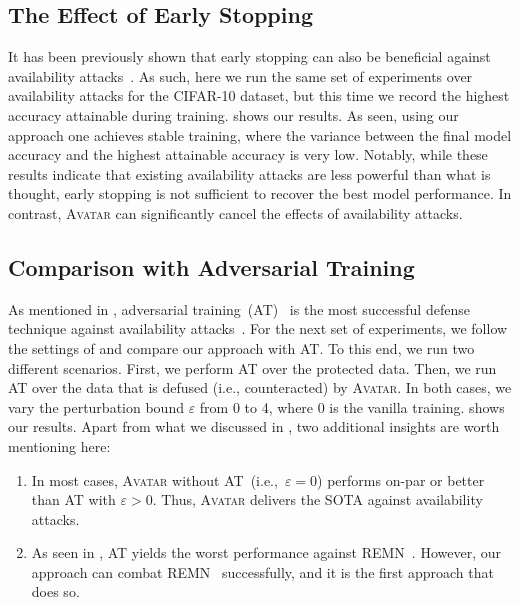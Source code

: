 \documentclass[conference]{IEEEtran}
\theoremstyle{definition}
\theoremstyle{remark}
\theoremstyle{proposition}
\begin{document}
\subsection{The Effect of Early Stopping}\label{sec:sec:early_stopping}
It has been previously shown that early stopping can also be beneficial against availability attacks~\citep{huang2021emn}.
As such, here we run the same set of experiments over availability attacks for the CIFAR-10 dataset, but this time we record the highest accuracy attainable during training.
 shows our results.
As seen, using our approach one achieves stable training, where the variance between the final model accuracy and the highest attainable accuracy is very low.
Notably, while these results indicate that existing availability attacks are less powerful than what is thought, early stopping is not sufficient to recover the best model performance.
In contrast, \textsc{Avatar} can significantly cancel the effects of availability attacks.

\subsection{Comparison with Adversarial Training}\label{sec:sec:AT}
As mentioned in , adversarial training~(AT)~\citep{madry2018towards} is the most successful defense technique against availability attacks~\citep{tao2021preventing}.
For the next set of experiments, we follow the settings of \citet{fu2022remn} and compare our approach with AT.
To this end, we run two different scenarios.
First, we perform AT over the protected data.
Then, we run AT over the data that is defused (i.e., counteracted) by \textsc{Avatar}.
In both cases, we vary the perturbation bound $\varepsilon$ from 0 to 4, where 0 is the vanilla training.
 shows our results.
Apart from what we discussed in , two additional insights are worth mentioning here:
\begin{enumerate}[(1)]\setlength\itemsep{-0.5pt}
        \item In most cases, \textsc{Avatar} without AT~(i.e.,~${\varepsilon = 0}$) performs on-par or better than AT with ${\varepsilon > 0}$.
        Thus, \textsc{Avatar} delivers the SOTA against availability attacks.
        \item As seen in , AT yields the worst performance against REMN~\citep{fu2022remn}.
        However, our approach can combat REMN~\citep{fu2022remn} successfully, and it is the first approach that does so.
\end{enumerate}
\end{document}
